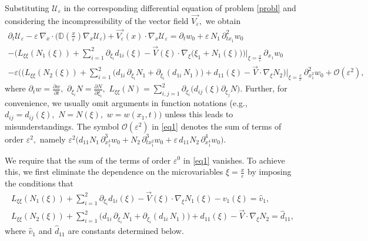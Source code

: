 \documentclass[reqno]{amsart}            %
\numberwithin{equation}{section}
\begin{document}
	Substituting $\mathcal{U}_\varepsilon$ in the corresponding differential equation of  problem \eqref{probl} and considering the incompressibility of the vector field $\overrightarrow{V_\varepsilon},$ we obtain
	\begin{multline}\label{eq1}
		\partial_t \mathcal{U}_\varepsilon -  \varepsilon\, \nabla_x \cdot\big( \mathbb{D}(\tfrac{x}{\varepsilon}) \nabla_x \mathcal{U}_\varepsilon \big) +
		\overrightarrow{V_\varepsilon}(x) \cdot \nabla_x \mathcal{U}_\varepsilon =
		\partial_t w_0 + \varepsilon\, N_1\, \partial^2_{t x_1}w_0
		\\
		- \Big(L_{\xi\xi}(N_1(\xi)) + \sum_{i=1}^{2} \partial_{\xi_i} d_{1 i}(\xi) - \overrightarrow{V}(\xi) \cdot \nabla_{\xi}\big(\xi_1 + N_1(\xi)\big)\Big)\Big|_{\xi=\frac{x}{\varepsilon}} \, \partial_{x_1} w_0
		\\
		- \varepsilon \bigg(\Big( L_{\xi\xi}(N_{2}(\xi)) + \sum_{i=1}^{2} \big(d_{1 i}\, \partial_{\xi_i}N_1  +
		\partial_{\xi_i}(d_{1 i} \, N_1)\big) + d_{11}(\xi) - \overrightarrow{V} \cdot \nabla_{\xi}N_{2}\Big)\Big|_{\xi=\frac{x}{\varepsilon}}\,  \partial^2_{x^2_1} w_0
		+ \mathcal{O}(\varepsilon^2),
	\end{multline}
	where $\partial_{t}w = \frac{\partial w}{\partial t},$ $\partial_{\xi_i}N = \frac{\partial N}{\partial \xi_i},$ $L_{\xi\xi}(N) = \sum_{i, j =1}^{2} \partial_{\xi_i}\big(d_{i j}(\xi) \partial_{\xi_j} N\big).$ Further, for convenience, we usually omit arguments in function notations (e.g., $d_{i j} = d_{i j}(\xi),$ $N = N(\xi),$ $w = w(x_1,t))$ unless this leads to misunderstandings. The symbol $\mathcal{O}(\varepsilon^2)$ in \eqref{eq1} denotes  the sum of terms of order $\varepsilon^2,$ namely
	$\varepsilon^2 \big(d_{11} N_{1} \, \partial^3_{x^3_1}w_0  + N_2\, \partial^3_{t x^2_1}w_0 + \varepsilon\, d_{11} N_{2} \, \partial^4_{x^4_1}w_0\big).$
	
	We require that the sum of the terms of order $\varepsilon^0$ in \eqref{eq1} vanishes. 
	To achieve this, we first eliminate the dependence on the microvariables $\xi = \frac{x}{\varepsilon}$ by imposing the conditions that
	\begin{gather}\label{eq2}
		L_{\xi\xi}(N_1(\xi)) + \sum_{i=1}^{2} \partial_{\xi_i} d_{1 i}(\xi) - \overrightarrow{V}(\xi) \cdot \nabla_{\xi}N_1(\xi) - v_1(\xi) =  \widehat{v}_1,
		\\ \label{eq3}
		L_{\xi\xi}(N_{2}(\xi)) + \sum_{i=1}^{2} \big(d_{1 i}\, \partial_{\xi_i}N_1  +
		\partial_{\xi_i}(d_{1 i} \, N_1)\big) + d_{11}(\xi) - \overrightarrow{V} \cdot \nabla_{\xi}N_{2} = \widehat{d}_{11} ,
	\end{gather}
	where $\widehat{v}_1$ and $\widehat{d}_{11}$ are constants  determined below.
	
\end{document}
